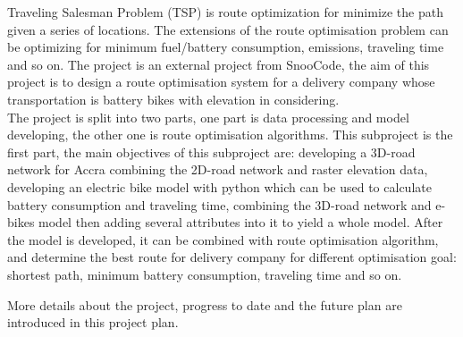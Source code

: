 Traveling Salesman Problem (TSP) is route optimization for minimize the path given a series of locations.
The extensions of the route optimisation problem can be optimizing for minimum fuel/battery consumption, emissions, traveling time and so on.
The project is an external project from SnooCode, the aim of this project is to design a route optimisation system for a delivery company whose transportation is battery bikes with elevation in considering.\\

The project is split into two parts, one part is data processing and model developing, the other one is route optimisation algorithms.
This subproject is the first part, the main objectives of this subproject are: developing a 3D-road network for Accra combining the 2D-road network and raster elevation data, 
developing an electric bike model with python which can be used to calculate battery consumption and traveling time, 
combining the 3D-road network and e-bikes model then adding several attributes into it to yield a whole model.
After the model is developed, it can be combined with route optimisation algorithm, and determine the best route for delivery company for different optimisation goal: shortest path, minimum battery consumption, traveling time and so on.

More details about the project, progress to date and the future plan are introduced in this project plan.